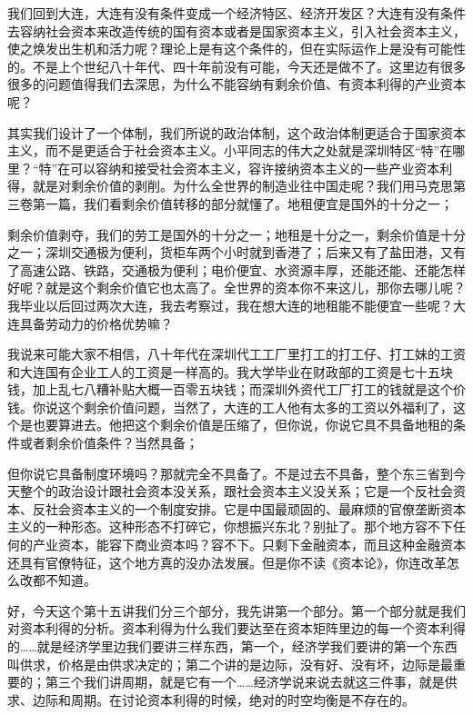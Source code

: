 \documentclass[UTF8, 12pt, a4paper]{ctexrep}
\begin{document}
我们回到大连，大连有没有条件变成一个经济特区、经济开发区？大连有没有条件去容纳社会资本来改造传统的国有资本或者是国家资本主义，引入社会资本主义，使之焕发出生机和活力呢？理论上是有这个条件的，但在实际运作上是没有可能性的。不是上个世纪八十年代、四十年前没有可能，今天还是做不了。这里边有很多很多的问题值得我们去深思，为什么不能容纳有剩余价值、有资本利得的产业资本呢？

其实我们设计了一个体制，我们所说的政治体制，这个政治体制更适合于国家资本主义，而不是更适合于社会资本主义。小平同志的伟大之处就是深圳特区“特”在哪里？“特”在可以容纳和接受社会资本主义，容许接纳资本主义的一些产业资本利得，就是对剩余价值的剥削。为什么全世界的制造业往中国走呢？我们用马克思第三卷第一篇，我们看剩余价值转移的部分就懂了。地租便宜是国外的十分之一；

剩余价值剥夺，我们的劳工是国外的十分之一；地租是十分之一，剩余价值是十分之一；深圳交通极为便利，货柜车两个小时就到香港了；后来又有了盐田港，又有了高速公路、铁路，交通极为便利；电价便宜、水资源丰厚，还能还能、还能怎样好呢？就是这个剩余价值它也太高了。全世界的资本你不来这儿，那你去哪儿呢？我毕业以后回过两次大连，我去考察过，我在想大连的地租能不能便宜一些呢？大连具备劳动力的价格优势嘛？

我说来可能大家不相信，八十年代在深圳代工工厂里打工的打工仔、打工妹的工资和大连国有企业工人的工资是一样高的。我大学毕业在财政部的工资是七十五块钱，加上乱七八糟补贴大概一百零五块钱；而深圳外资代工厂打工的钱就是这个价钱。你说这个剩余价值问题，当然了，大连的工人他有太多的工资以外福利了，这个是也要算进去。他把这个剩余价值是压缩了，但你说，你说它具不具备地租的条件或者剩余价值条件？当然具备；

但你说它具备制度环境吗？那就完全不具备了。不是过去不具备，整个东三省到今天整个的政治设计跟社会资本没关系，跟社会资本主义没关系；它是一个反社会资本、反社会资本主义的一个制度安排。它是中国最顽固的、最麻烦的官僚垄断资本主义的一种形态。这种形态不打碎它，你想振兴东北？别扯了。那个地方容不下任何的产业资本，能容下商业资本吗？容不下。只剩下金融资本，而且这种金融资本还具有官僚特征，这个地方真的没办法发展。但是你不读《资本论》，你连改革怎么改都不知道。

好，今天这个第十五讲我们分三个部分，我先讲第一个部分。第一个部分就是我们对资本利得的分析。资本利得为什么我们要达至在资本矩阵里边的每一个资本利得的……就是经济学里边我们要讲三样东西，第一个，经济学我们要讲的第一个东西叫供求，价格是由供求决定的；第二个讲的是边际，没有好、没有坏，边际是最重要的；第三个我们讲周期，就是它有一个……经济学说来说去就这三件事，就是供求、边际和周期。在讨论资本利得的时候，绝对的时空均衡是不存在的。
\end{document}
